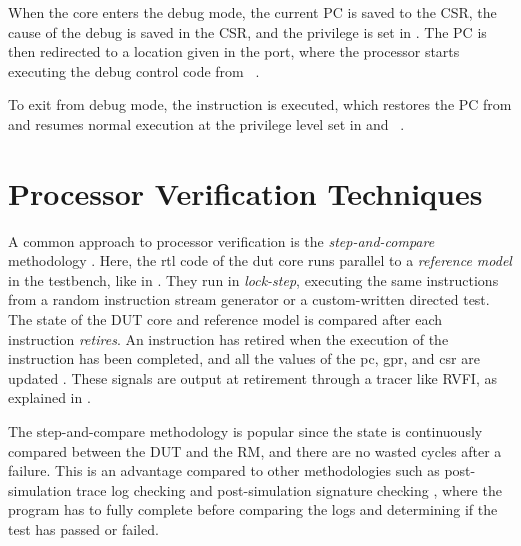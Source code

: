 When the core enters the debug mode, the current PC is saved to the  CSR, the cause of the debug is saved in the  CSR, and the privilege is set in . The PC is then redirected to a location given in the  port, where the processor starts executing the debug control code from ~\cite{openhwgroupDebugTriggerCOREV2023}.

To exit from debug mode, the  instruction is executed, which restores the PC from  and resumes normal execution at the privilege level set in  and ~\cite{pauldonahueRISCVDebugSupport2023}.

\section{Processor Verification Techniques}
\label{sec:bg_verificationTech}


A common approach to processor verification is the \textit{step-and-compare} methodology \cite{taylorAdvancedRISCVVerification2023}. Here, the \acrshort{rtl} code of the \acrshort{dut} core runs parallel to a \textit{reference model} in the testbench, like in . They run in \textit{lock-step}, executing the same instructions from a random instruction stream generator or a custom-written directed test. The state of the DUT core and reference model is compared after each instruction \textit{retires}. An instruction has retired when the execution of the instruction has been completed, and all the values of the \acrfull{pc}, \acrfull{gpr}, and \acrfull{csr} are updated \cite{taylorAdvancedRISCVVerification2023}. These signals are output at retirement through a tracer like RVFI, as explained in .

The step-and-compare methodology is popular since the state is continuously compared between the DUT and the RM, and there are no wasted cycles after a failure. This is an advantage compared to other methodologies such as post-simulation trace log checking and post-simulation signature checking \cite{duncangrahamRISCVVerificationImplications2023}, where the program has to fully complete before comparing the logs and determining if the test has passed or failed.


